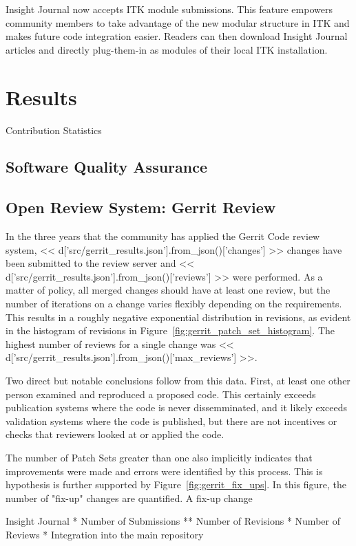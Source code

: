 \documentclass{frontiersENG} %
\begin{document}
\begin{enumeruate}
Insight Journal now accepts ITK module submissions. This feature empowers community members to take advantage of the new modular structure in ITK and makes future code integration easier. Readers can then download Insight Journal articles and directly plug-them-in as modules of their local ITK installation.


\section{Results}

Contribution Statistics
\subsection{Software Quality Assurance}

\subsection{Open Review System: Gerrit Review}
In the three years that the community has applied the Gerrit Code review
system, << d['src/gerrit_results.json'].from_json()['changes'] >> changes have
been submitted to the review server and
<< d['src/gerrit_results.json'].from_json()['reviews'] >> were performed.
As a matter of policy, all merged changes should have at least one review,
but the number of iterations on a change varies flexibly depending on the
requirements. This results in a roughly negative exponential distribution in
revisions, as evident in the histogram of revisions in
Figure~\ref{fig:gerrit_patch_set_histogram}.  The highest number of reviews
for a single change was
<< d['src/gerrit_results.json'].from_json()['max_reviews'] >>.

Two direct but notable conclusions follow from this data. First, at least one
other person examined and reproduced a proposed code.  This certainly exceeds
publication systems where the code is never dissemminated, and it likely
exceeds validation systems where the code is published, but there are not
incentives or checks that reviewers looked at or applied the code.

The number of Patch Sets greater than one also implicitly indicates that
improvements were made and errors were identified by this process.  This is
hypothesis is further supported by Figure~\ref{fig:gerrit_fix_ups}.  In this
figure, the number of "fix-up" changes are quantified. A fix-up change 


Insight Journal
* Number of Submissions
** Number of Revisions
* Number of Reviews
* Integration into the main repository



\end{enumeruate}
\end{document}
